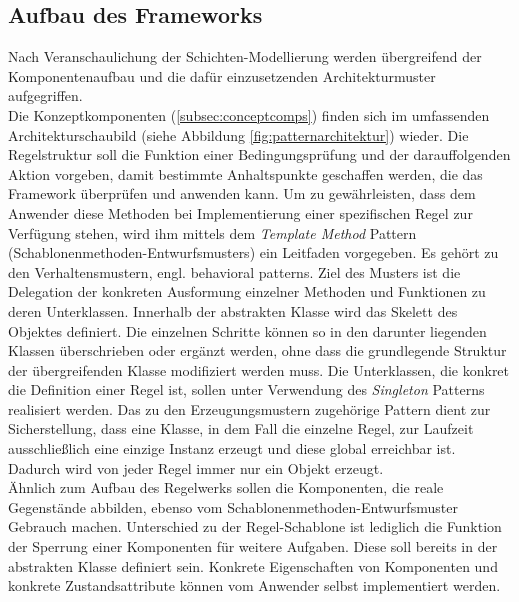     \subsection{Aufbau des Frameworks}
        Nach Veranschaulichung der Schichten-Modellierung werden übergreifend der Komponentenaufbau und die dafür einzusetzenden Architekturmuster aufgegriffen. 
        \\
        Die Konzeptkomponenten (\ref{subsec:conceptcomps}) finden sich im umfassenden Architekturschaubild (siehe Abbildung \ref{fig:patternarchitektur}) wieder. 
        Die Regelstruktur soll die Funktion einer Bedingungsprüfung und der darauffolgenden Aktion vorgeben, damit bestimmte Anhaltspunkte geschaffen werden, die das Framework überprüfen 
        und anwenden kann. Um zu gewährleisten, dass dem Anwender diese Methoden bei Implementierung einer spezifischen Regel zur Verfügung stehen, wird ihm mittels dem 
        \textit{Template Method} Pattern \cite{gamma1995template} (Schablonenmethoden-Entwurfsmusters) ein Leitfaden vorgegeben. Es gehört zu den Verhaltensmustern, engl. behavioral patterns. 
        Ziel des Musters ist die Delegation der konkreten Ausformung einzelner Methoden und Funktionen zu deren Unterklassen. Innerhalb der 
        abstrakten Klasse wird das Skelett des Objektes definiert. Die einzelnen Schritte können so in den darunter liegenden Klassen überschrieben oder ergänzt 
        werden, ohne dass die grundlegende Struktur der übergreifenden Klasse modifiziert werden muss. Die Unterklassen, die konkret die Definition einer Regel ist, sollen 
        unter Verwendung des \textit{Singleton} Patterns \cite{gamma1995singleton} realisiert werden. Das zu den Erzeugungsmustern 
        zugehörige Pattern dient zur 
        Sicherstellung, dass eine Klasse, in dem Fall die einzelne Regel, zur Laufzeit ausschließlich eine einzige Instanz erzeugt und diese global erreichbar ist. 
        Dadurch wird von jeder Regel immer nur ein Objekt erzeugt. 
        \\
        \linebreak
        Ähnlich zum Aufbau des Regelwerks sollen die Komponenten, die reale Gegenstände abbilden, ebenso vom Schablonenmethoden-Entwurfsmuster Gebrauch machen. 
        Unterschied zu der Regel-Schablone ist lediglich die Funktion der Sperrung einer Komponenten für weitere Aufgaben. Diese soll bereits in der abstrakten Klasse 
        definiert sein. Konkrete Eigenschaften von Komponenten und konkrete Zustandsattribute können vom Anwender selbst implementiert werden.
        \\

